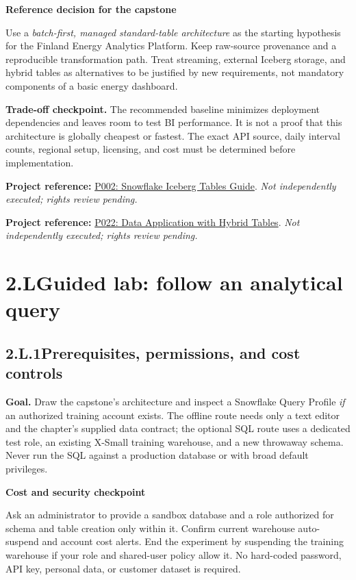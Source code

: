 \documentclass[11pt,twoside]{article}
\newcommand{\topic}[2]{\subsection*{#1\quad #2}}
\newcommand{\repo}[2]{\par\begingroup\fontsize{8.0}{9.6}\selectfont\sffamily\color{inkgray}\textbf{Project reference:} \href{#2}{#1}. \textit{Not independently executed; rights review pending.}\par\endgroup}
\begin{document}
\begin{insight}
\textbf{Reference decision for the capstone}\par
Use a \emph{batch-first, managed standard-table architecture} as the starting hypothesis for the Finland Energy Analytics Platform. Keep raw-source provenance and a reproducible transformation path. Treat streaming, external Iceberg storage, and hybrid tables as alternatives to be justified by new requirements, not mandatory components of a basic energy dashboard.
\end{insight}

\textbf{Trade-off checkpoint.} The recommended baseline minimizes deployment dependencies and leaves room to test BI performance. It is not a proof that this architecture is globally cheapest or fastest. The exact API source, daily interval counts, regional setup, licensing, and cost must be determined before implementation.
\repo{P002: Snowflake Iceberg Tables Guide}{https://github.com/Snowflake-Labs/sfguide-getting-started-with-iceberg-tables}
\repo{P022: Data Application with Hybrid Tables}{https://github.com/Snowflake-Labs/sfguide-build-data-application-with-hybrid-tables}

\newpage
\section*{2.L\quad Guided lab: follow an analytical query}
\topic{2.L.1}{Prerequisites, permissions, and cost controls}
\textbf{Goal.} Draw the capstone's architecture and inspect a Snowflake Query Profile \emph{if} an authorized training account exists. The offline route needs only a text editor and the chapter's supplied data contract; the optional SQL route uses a dedicated test role, an existing X-Small training warehouse, and a new throwaway schema. Never run the SQL against a production database or with broad default privileges.

\begin{whitebox}
\textbf{Cost and security checkpoint}\par
Ask an administrator to provide a sandbox database and a role authorized for schema and table creation only within it. Confirm current warehouse auto-suspend and account cost alerts. End the experiment by suspending the training warehouse if your role and shared-user policy allow it. No hard-coded password, API key, personal data, or customer dataset is required.
\end{whitebox}
\end{document}
